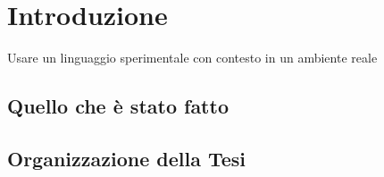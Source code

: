 
\chapter{Introduzione}  %

Usare un linguaggio sperimentale con contesto in un ambiente reale

\ifpdf
    \graphicspath{{Chapter1/Figs/Raster/}{Chapter1/Figs/PDF/}{Chapter1/Figs/}}
\else
    \graphicspath{{Chapter1/Figs/Vector/}{Chapter1/Figs/}}
\fi


\section{Quello che è stato fatto} %

 

\section{Organizzazione della Tesi} %



 
